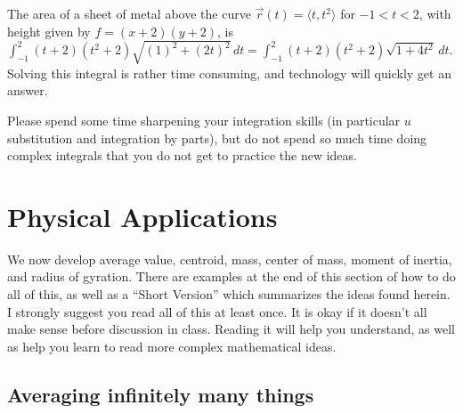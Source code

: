 \begin{example}
%
The area of a sheet of metal above the curve $\vec
r(t)=\langle t,t^2\rangle$ for $-1<t<2$, with height given by
{$f=(x+2)(y+2)$}, is 
$\int_{-1}^{2}(t+2)(t^2+2)\sqrt{(1)^2+(2t)^2}\,dt 
= \int_{-1}^{2} (t+2)(t^2+2)\sqrt{1+4t^2}\,dt$. Solving this integral is
rather time consuming, and technology will quickly get an answer.
\end{example}

Please spend some time sharpening your integration skills (in
particular $u$ substitution and integration by parts), but do not
spend so much time doing complex integrals that you do not get to
practice the new ideas.


\section{Physical Applications}
We now develop average value, centroid, mass, center of mass, moment
of inertia, and radius of gyration. There are examples at the end of
this section of how to do all of this, as well as a ``Short Version''
which summarizes the ideas found herein. I strongly suggest you read
all of this at least once. It is okay if it doesn't all make sense
before discussion in class.  Reading it will help you understand, as
well as help you learn to read more complex mathematical ideas. 

\subsection{Averaging infinitely many things}


